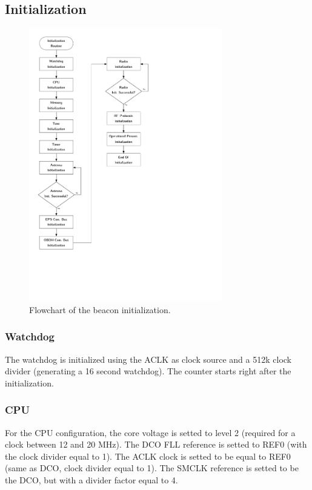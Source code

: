 \documentclass[12pt]{book}
\begin{document}
\subsection{Initialization}

\begin{figure}[!h]
	\begin{center}
		\includegraphics[width=0.75\textwidth]{figures/beacon_init_flowchart.pdf}
		\caption{Flowchart of the beacon initialization.}
		\label{fig:beacon-init-flowchart}
	\end{center}
\end{figure}

\subsubsection{Watchdog}

The watchdog is initialized using the ACLK as clock source and a 512k clock divider (generating a 16 second watchdog). The counter starts right after the initialization.

\subsubsection{CPU}

For the CPU configuration, the core voltage is setted to level 2 (required for a clock between 12 and 20 MHz). The DCO FLL reference is setted to REF0 (with the clock divider equal to 1). The ACLK clock is setted to be equal to REF0 (same as DCO, clock divider equal to 1). The SMCLK reference is setted to be the DCO, but with a divider factor equal to 4.
\end{document}

